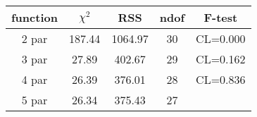 \begin{tabular}{c|c|c|c|c}
function & $\chi^2$ & RSS & ndof & F-test \\
\hline
2 par & 187.44 & 1064.97 & 30 & CL=0.000 \\
3 par & 27.89 & 402.67 & 29 & CL=0.162 \\
4 par & 26.39 & 376.01 & 28 & CL=0.836 \\
5 par & 26.34 & 375.43 & 27 & \\
\hline
\end{tabular}